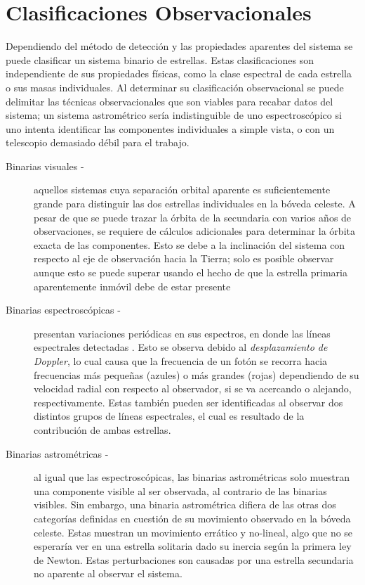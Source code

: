 \section{Clasificaciones Observacionales}

Dependiendo del método de detección y las propiedades aparentes del sistema se
puede clasificar un sistema binario de estrellas. Estas clasificaciones son
independiente de sus propiedades físicas, como la clase espectral de cada
estrella o sus masas individuales. Al determinar su clasificación observacional
se puede delimitar las técnicas observacionales que son viables para recabar
datos del sistema; un sistema astrométrico sería indistinguible de uno
espectroscópico si uno intenta identificar las componentes individuales a simple
vista, o con un telescopio demasiado débil para el trabajo.

\begin{description}
	\item[Binarias visuales -] aquellos sistemas cuya separación orbital
	aparente es suficientemente grande para distinguir las dos estrellas
	individuales en la bóveda celeste. A pesar de que se puede trazar la órbita
	de la secundaria con varios años de observaciones, se requiere de cálculos
	adicionales para determinar la órbita exacta de las componentes. Esto se
	debe a la inclinación del sistema con respecto al eje de observación hacia
	la Tierra; solo es posible observar  aunque esto se puede superar usando
	el hecho de que la estrella primaria aparentemente inmóvil debe de estar
	presente 

	\item[Binarias espectroscópicas -] presentan variaciones periódicas en sus
	espectros, en donde las líneas espectrales detectadas 
	. Esto se observa debido
	al \textit{desplazamiento de Doppler}, lo cual causa que la frecuencia de un
	fotón se recorra hacia frecuencias más pequeñas (azules) o más grandes
	(rojas) dependiendo de su velocidad radial con respecto al observador, si se
	va acercando o alejando, respectivamente. Estas también pueden ser identificadas
	al observar dos distintos grupos de líneas espectrales, el cual es resultado
	de la contribución de ambas estrellas.

	\item[Binarias astrométricas -] al igual que las espectroscópicas, las
	binarias astrométricas solo muestran una componente visible al ser
	observada, al contrario de las binarias visibles. Sin embargo, una binaria
	astrométrica difiera de las otras dos categorías definidas en cuestión de su
	movimiento observado en la bóveda celeste. Estas muestran un movimiento
	errático y no-lineal, algo que no se esperaría ver en una estrella solitaria
	dado su inercia según la primera ley de Newton. Estas perturbaciones son
	causadas por una estrella secundaria no aparente al observar el sistema. 
\end{description}

